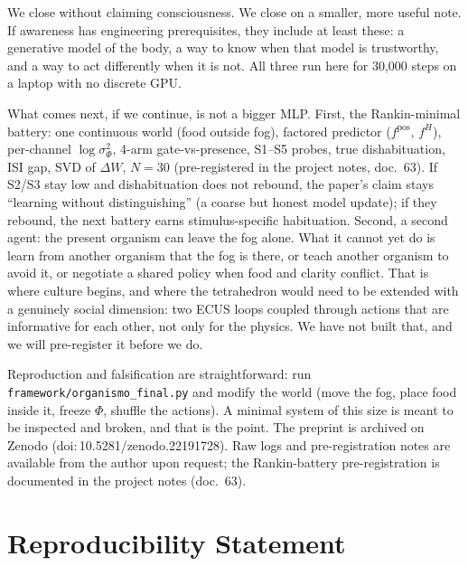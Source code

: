 \documentclass[11pt,a4paper]{article}
\begin{document}
We close without claiming consciousness. We close on a smaller, more useful note. If awareness has engineering prerequisites, they include at least these: a generative model of the body, a way to know when that model is trustworthy, and a way to act differently when it is not. All three run here for 30,000 steps on a laptop with no discrete GPU.

What comes next, if we continue, is not a bigger MLP. First, the Rankin-minimal battery: one continuous world (food outside fog), factored predictor ($f^{\mathrm{pos}}$, $f^{H}$), per-channel $\log \sigma^2_{\Phi}$, 4-arm gate-vs-presence, S1--S5 probes, true dishabituation, ISI gap, SVD of $\Delta W$, $N=30$ (pre-registered in the project notes, doc.~63). If S2/S3 stay low and dishabituation does not rebound, the paper's claim stays ``learning without distinguishing'' (a coarse but honest model update); if they rebound, the next battery earns stimulus-specific habituation. Second, a second agent: the present organism can leave the fog alone. What it cannot yet do is learn from another organism that the fog is there, or teach another organism to avoid it, or negotiate a shared policy when food and clarity conflict. That is where culture begins, and where the tetrahedron would need to be extended with a genuinely social dimension: two ECUS loops coupled through actions that are informative for each other, not only for the physics. We have not built that, and we will pre-register it before we do.

Reproduction and falsification are straightforward: run \texttt{framework/organismo\_final.py} and modify the world (move the fog, place food inside it, freeze $\Phi$, shuffle the actions). A minimal system of this size is meant to be inspected and broken, and that is the point. The preprint is archived on Zenodo (doi:\,10.5281/zenodo.22191728). Raw logs and pre-registration notes are available from the author upon request; the Rankin-battery pre-registration is documented in the project notes (doc.~63).

\section{Reproducibility Statement}
\end{document}
